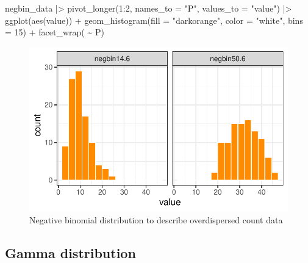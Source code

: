 \documentclass[
  letterpaper,
  DIV=11,
  numbers=noendperiod]{scrreprt}
\newenvironment{Shaded}{\begin{snugshade}}{\end{snugshade}}
\newcommand{\AttributeTok}[1]{\textcolor[rgb]{0.40,0.45,0.13}{#1}}
\newcommand{\DecValTok}[1]{\textcolor[rgb]{0.68,0.00,0.00}{#1}}
\newcommand{\FunctionTok}[1]{\textcolor[rgb]{0.28,0.35,0.67}{#1}}
\newcommand{\NormalTok}[1]{\textcolor[rgb]{0.00,0.23,0.31}{#1}}
\newcommand{\SpecialCharTok}[1]{\textcolor[rgb]{0.37,0.37,0.37}{#1}}
\newcommand{\StringTok}[1]{\textcolor[rgb]{0.13,0.47,0.30}{#1}}
\begin{document}
\begin{Shaded}
\begin{Highlighting}[]
\NormalTok{negbin\_data }\SpecialCharTok{|\textgreater{}}
  \FunctionTok{pivot\_longer}\NormalTok{(}\DecValTok{1}\SpecialCharTok{:}\DecValTok{2}\NormalTok{, }\AttributeTok{names\_to =} \StringTok{"P"}\NormalTok{,}
               \AttributeTok{values\_to =} \StringTok{"value"}\NormalTok{) }\SpecialCharTok{|\textgreater{}}
  \FunctionTok{ggplot}\NormalTok{(}\FunctionTok{aes}\NormalTok{(value)) }\SpecialCharTok{+}
  \FunctionTok{geom\_histogram}\NormalTok{(}\AttributeTok{fill =} \StringTok{"darkorange"}\NormalTok{,}
                 \AttributeTok{color =} \StringTok{"white"}\NormalTok{, }\AttributeTok{bins =} \DecValTok{15}\NormalTok{) }\SpecialCharTok{+}
  \FunctionTok{facet\_wrap}\NormalTok{( }\SpecialCharTok{\textasciitilde{}}\NormalTok{ P) }
\end{Highlighting}
\end{Shaded}

\begin{figure}[H]

{\centering \includegraphics{data-terminology_files/figure-pdf/fig-negbin-1.pdf}

}

\caption{\label{fig-negbin}Negative binomial distribution to describe
overdispersed count data}

\end{figure}

\hypertarget{gamma-distribution}{%
\subsection{Gamma distribution}\label{gamma-distribution}}
\end{document}
